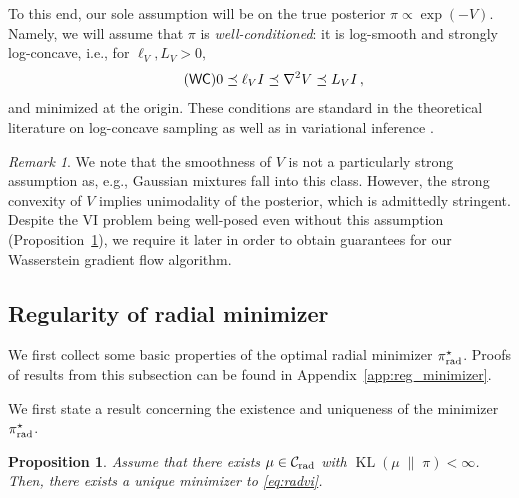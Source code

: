 \documentclass[twoside]{article}
\newcommand{\cC}{\mathcal{C}}
\newcommand{\1}{\mathds{1}}
\newcommand{\kl}[2]{\KL(#1 \!\;\|\; \!#2)}
\DeclareMathOperator*{\KL}{KL}
\newcommand{\pirad}{\pi_{\rm rad}}
\newcommand{\Crad}{\cC_{\rm rad}}
\theoremstyle{plain}
\newtheorem{prop}[theorem]{Proposition}
\theoremstyle{definition}
\theoremstyle{remark}
\newtheorem{remark}[theorem]{Remark}
\begin{document}
To this end, our sole assumption will be on the true posterior $\pi\propto\exp(-V)$. Namely, we will assume that $\pi$ is \emph{well-conditioned}: it is log-smooth and strongly log-concave, i.e., for $ \ell_V, L_V > 0,$
\begin{align}\label{well_cond} \tag{$\mathsf{WC}$}
0 \preceq \ell_V I \preceq \nabla^2 V \preceq L_V I\,,
\end{align} 
and minimized at the origin.
These conditions are standard in the theoretical literature on log-concave sampling \citep{ChewiBook} as well as in variational inference \citep[see, e.g.,][]{Lambert2022, arnese2024convergence, Lacker2024, lavenant2024convergence, JiaChePoo24MFVI}.

\begin{remark}
We note that the smoothness of $V$ is not a particularly strong assumption as, e.g., Gaussian mixtures fall into this class. However, the strong convexity of $V$ implies unimodality of the posterior, {which is admittedly stringent. Despite the VI problem being well-posed even without this assumption (Proposition~\ref{existence_uniqueness}), we require it later in order to obtain guarantees for our Wasserstein gradient flow algorithm.}
\end{remark}

\subsection{Regularity of radial minimizer}\label{sec:reg_minimizer}
We first collect some basic properties of the optimal radial minimizer $\pirad^\star$. Proofs of results from this subsection can be found in Appendix~\ref{app:reg_minimizer}.

We first state a result concerning the existence and uniqueness of the minimizer $\pirad^\star$.
\begin{prop}\label{existence_uniqueness}
Assume that there exists $\mu \in \Crad$ with $\kl{\mu}{\pi} < \infty$.
Then, there exists a unique minimizer to \eqref{eq:radvi}.
\end{prop}
\end{document}
